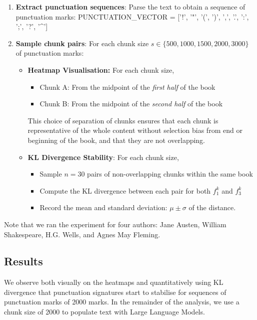 \documentclass{article}
\begin{document}
\begin{enumerate}
    \item \textbf{Extract punctuation sequences}: Parse the text to obtain a sequence of punctuation marks: PUNCTUATION\_VECTOR = ['!', '"', '(', ')', ',', '.', ':', ';', '?', '\^{}']

    
    \item \textbf{Sample chunk pairs}: For each chunk size $s \in \{500, 1000, 1500, 2000, 3000\}$ of punctuation marks:

    \begin{itemize}
    \item \textbf{Heatmap Visualisation:} For each chunk size, 
    \begin{itemize}
        \item Chunk A: From the midpoint of the \emph{first half} of the book
        \item Chunk B: From the midpoint of the \emph{second half} of the book
    \end{itemize}
    This choice of separation of chunks ensures that each chunk is representative of the whole content without selection bias from end or beginning of the book, and that they are not overlapping.
    
    \end{itemize}
    
    \begin{itemize}
    \item \textbf{KL Divergence Stability}: For each chunk size,
    \begin{itemize}
        \item Sample $n = 30$ pairs of non-overlapping chunks within the same book
        \item Compute the KL divergence between each pair for both $f_1^k$ and $f_3^k$
        \item Record the mean and standard deviation: $\mu \pm \sigma$ of the distance.
    \end{itemize}
    \end{itemize}

\end{enumerate}
Note that we ran the experiment for four authors: Jane Austen, William Shakespeare, H.G. Wells, and Agnes May Fleming.

\subsection{Results}
We observe both visually on the heatmaps and quantitatively using KL divergence that punctuation signatures start to stabilise for sequences of punctuation marks of 2000 marks. In the remainder of the analysis, we use a chunk size of 2000 to populate text with Large Language Models.
\end{document}
